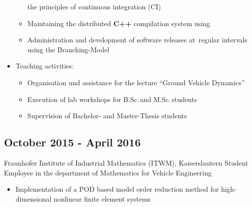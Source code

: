 \documentclass{mycv}
\begin{document}
\begin{paracol}{2}
\begin{itemize}
\begin{itemize}
					the principles of continuous integration (CI)
				\item Maintaining the distributed {\bfseries C++} compilation
					system using \href{https://github.com/distcc/distcc}{}
				\item Administration and development of software releases at \,regular
					intervals using the
					\href{https://nvie.com/posts/a-successful-git-branching-model/}{}
					Branching-Model
			\end{itemize}
			\item Teaching activities:
				\begin{itemize}
					\item Organisation und assistance for the lecture ``Ground Vehicle
						Dynamics''
					\item Execution of lab workshops for B.Sc.\,and M.Sc.\,students
					\item Supervision of Bachelor- and Master-Thesis students\\
				\end{itemize}
		\end{itemize}

\subsection{October 2015 - April 2016}{Fraunhofer Institute of Industrial
	Mathematics (ITWM), \quad\quad Kaiserslautern}
{Student Employee in the department of Mathematics for Vehicle Engineering}
	  \begin{itemize}
			\item Implementation of a POD based model order reduction method for
				high-dimensional nonlinear finite element systems\\
		\end{itemize}

\end{paracol}
\end{document}
